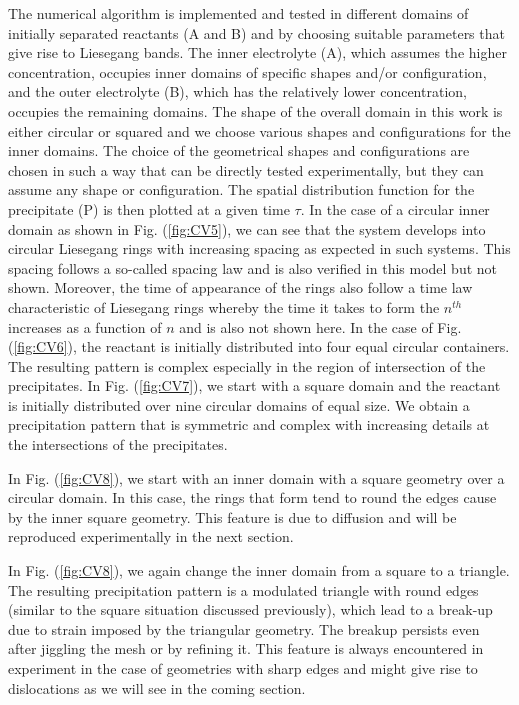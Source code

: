 \documentclass[aps,preprint]{revtex4}
\begin{document}
The numerical algorithm is implemented and tested in different domains of
initially separated reactants (A and B) and by choosing suitable parameters
that give rise to Liesegang bands. The inner electrolyte (A), which assumes
the higher concentration, occupies inner domains of specific shapes and/or
configuration, and the outer electrolyte (B), which has the relatively lower
concentration, occupies the remaining domains. The shape of the overall domain
in this work is either circular or squared and we choose various shapes and
configurations for the inner domains. The choice of the geometrical shapes and
configurations are chosen in such a way that can be directly tested
experimentally, but they can assume any shape or configuration. The spatial
distribution function for the precipitate (P) is then plotted at a given time
$\tau$. In the case of a circular inner domain as shown in Fig. (\ref{fig:CV5}), we can see that the system develops into circular Liesegang rings with
increasing spacing as expected in such systems\cite{so79470}. This spacing
follows a so-called spacing law \cite{chemistryinmotion} and is also verified in this model but not
shown. Moreover, the time of appearance of the rings also follow a time law\cite{chemistryinmotion}
characteristic of Liesegang rings whereby the time it takes to form the
$n^{th}$ increases as a function of $n$ and is also not shown here. In the
case of Fig. (\ref{fig:CV6}), the reactant is initially distributed into four
equal circular containers. The resulting pattern is complex especially in the
region of intersection of the precipitates. In Fig. (\ref{fig:CV7}), we start
with a square domain and the reactant is initially distributed over nine
circular domains of equal size. We obtain a precipitation pattern that is
symmetric and complex with increasing details at the intersections of the precipitates.

In Fig. (\ref{fig:CV8}), we start with an inner domain with a
square geometry over a circular domain. In this case, the rings that form tend to round the 
edges cause by the inner square geometry. This feature is due to diffusion and will be reproduced
experimentally in the next section.  

In Fig. (\ref{fig:CV8}), we again change the inner domain from a square to a
triangle. The resulting precipitation pattern is a modulated triangle with round edges (similar to the 
square situation discussed previously), which
lead to a break-up due to strain imposed by the triangular geometry. The
breakup persists even after jiggling the mesh or by refining it. This feature is always encountered in 
experiment in the case of geometries with sharp edges and might give rise to dislocations as we will see in the coming section.
\end{document}
